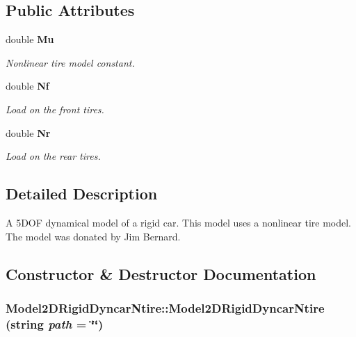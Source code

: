 \subsection*{Public Attributes}
\begin{CompactItemize}
\item 
double {\bf Mu}
\begin{CompactList}\small\item\em Nonlinear tire model constant.\item\end{CompactList}\item 
double {\bf Nf}
\begin{CompactList}\small\item\em Load on the front tires.\item\end{CompactList}\item 
double {\bf Nr}
\begin{CompactList}\small\item\em Load on the rear tires.\item\end{CompactList}\end{CompactItemize}


\subsection{Detailed Description}
A 5DOF dynamical model of a rigid car. This model uses a nonlinear tire model. The model was donated by Jim Bernard.



\subsection{Constructor \& Destructor Documentation}
\subsubsection{\setlength{\rightskip}{0pt plus 5cm}Model2DRigid\-Dyncar\-Ntire::Model2DRigid\-Dyncar\-Ntire (string {\em path} = \char`\"{}\char`\"{})}\label{classModel2DRigidDyncarNtire_a0}


